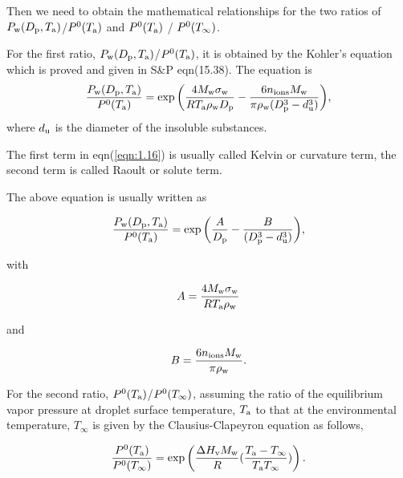\documentclass[12pt]{article}
\begin{document}
Then we need to obtain the mathematical relationships for the two ratios of $P_{\rm w}(D_{\rm p}, T_{\rm a})$/$P^{\rm 0}(T_{\rm a})$ and $P^{\rm 0}(T_{\rm a})$ / $P^{\rm 0}(T_{\infty})$. 


For the first ratio, $P_{\rm w}(D_{\rm p}, T_{\rm a})$/$P^{\rm 0}(T_{\rm a})$, it is obtained by the Kohler's equation which is proved and given in S$\&$P eqn(15.38). The equation is 
\begin{equation}\label{eqn:1.16}
 \frac{P_{\rm w}(D_{\rm p}, T_{\rm a})}{P^{\rm 0}(T_{\rm a})}=\exp{\left(\frac{4M_{\rm w} \sigma_{\rm w}}{RT_{\rm a}\rho_{\rm w}D_{\rm p}}-\frac{6n_{\rm ions}M_{\rm w}}{\pi \rho_{\rm w}(D_{\rm p}^{3}-d_{\rm u}^{3})}\right)},
\end{equation} 
where $d_{\rm u}$ is the diameter of the insoluble substances.

The first term in eqn(\ref{eqn:1.16}) is usually called Kelvin or curvature term, the second term is called Raoult or solute term.

The above equation is usually written as 

\begin{equation}\label{eqn:1.17}
\frac{P_{\rm w}(D_{\rm p}, T_{\rm a})}{P^{\rm 0}(T_{\rm a})}=\exp{\left(\frac{A}{D_{\rm p}}-\frac{B}{(D_{\rm p}^{3}-d_{\rm u}^{3})}\right)},
\end{equation} 

with 

\begin{equation}\label{eqn:1.18}
A=\frac{4 M_{\rm w}\sigma_{\rm w}} {R T_{\rm a} \rho_{\rm w}}
\end{equation}

and 

\begin{equation}\label{eqn:1.19}
B=\frac{6 n_{\rm ions} M_{\rm w}}{\pi \rho_{\rm w}}.
\end{equation}

For the second ratio, $P^{\rm 0}(T_{\rm a})$/$P^{\rm 0}(T_{\infty})$, assuming the ratio of the equilibrium vapor pressure at droplet surface temperature, $T_{\rm a}$ to that at the environmental temperature, $T_{\infty}$ is given by the Clausius-Clapeyron equation as follows,

\begin{equation}\label{eqn:1.20}
\frac{P^{\rm 0}(T_{\rm a})}{P^{\rm 0}(T_{\infty})}=\exp \left(\frac{\Delta H_{\rm v} M_{\rm w}}{R} (\frac{T_{\rm a}-T_{\infty}}{T_{\rm a} T_{\infty}})\right).
\end{equation}
\end{document}
